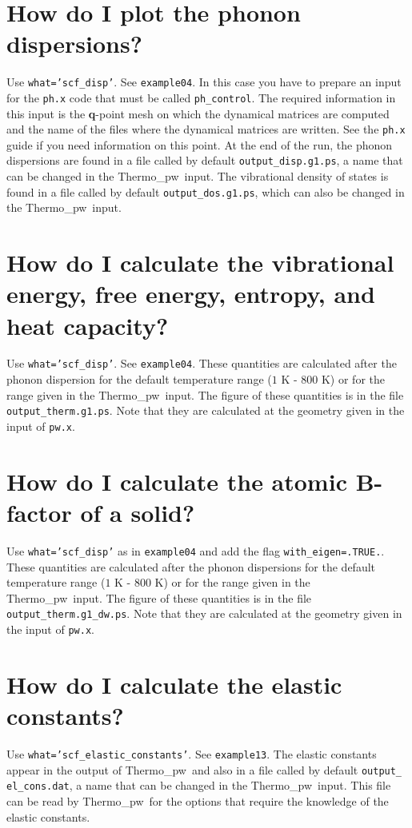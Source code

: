 \documentclass[12pt,a4paper,twoside]{report}
\def\thermo{{\sc Thermo}\_{\sc pw}}
\begin{document}
\newpage
{\color{coral}\section{How do I plot the phonon dispersions?}}
\color{black}
Use \texttt{what='scf\_disp'}. See \texttt{example04}. In this case you
have to prepare an input for the \texttt{ph.x} code that must be
called \texttt{ph\_control}. The required information in this input
is the {\bf q}-point mesh on which the dynamical matrices are computed
and the name of the files where the dynamical matrices are written.
See the \texttt{ph.x} guide if you need information on this point.
At the end of the run, the phonon dispersions are found in a file 
called by default \texttt{output\_disp.g1.ps},
a name that can be changed in the \thermo\ input.
The vibrational density of states is found in a file called by default
\texttt{output\_dos.g1.ps}, which can also be changed in the \thermo\ input.

\newpage
{\color{coral}\section{How do I calculate the vibrational energy, 
free energy, entropy, and heat capacity?}}
\color{black}
Use \texttt{what='scf\_disp'}. See \texttt{example04}. These quantities
are calculated after the phonon dispersion for the default 
temperature range ($1$ K - $800$ K) or for the range
given in the \thermo\ input. The figure of these quantities is in the file 
\texttt{output\_therm.g1.ps}.
Note that they are calculated at the geometry given in the input
of \texttt{pw.x}.

\newpage
{\color{coral}\section{How do I calculate the atomic B-factor of a solid?}}
\color{black}
Use \texttt{what='scf\_disp'} as in \texttt{example04} and add the
flag \texttt{with\_eigen=.TRUE.}. These quantities
are calculated after the phonon dispersions for the default 
temperature range ($1$ K - $800$ K) or for the range
given in the \thermo\ input. The figure of these quantities is in the file 
\texttt{output\_therm.g1\_dw.ps}.
Note that they are calculated at the geometry given in the input
of \texttt{pw.x}.

\newpage
{\color{coral}\section{How do I calculate the elastic constants?}}
\color{black}
Use \texttt{what='scf\_elastic\_constants'}. See \texttt{example13}. The
elastic constants appear in the output of \thermo\ and also in a file
called by default \texttt{output\_} \texttt{el\_cons.dat}, a name 
that can be changed in the \thermo\ input. This file can be read 
by \thermo\ for the options
that require the knowledge of the elastic constants.
\end{document}
